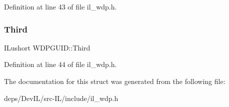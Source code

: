 Definition at line 43 of file il\+\_\+wdp.\+h.

\mbox{\label{structWDPGUID_a71b6f7b13e0b5005208d1f39a709dab5}} 
\subsubsection{\texorpdfstring{Third}{Third}}
{\footnotesize\ttfamily I\+Lushort W\+D\+P\+G\+U\+I\+D\+::\+Third}



Definition at line 44 of file il\+\_\+wdp.\+h.



The documentation for this struct was generated from the following file\+:\begin{DoxyCompactItemize}
\item 
deps/\+Dev\+I\+L/src-\/\+I\+L/include/il\+\_\+wdp.\+h\end{DoxyCompactItemize}
